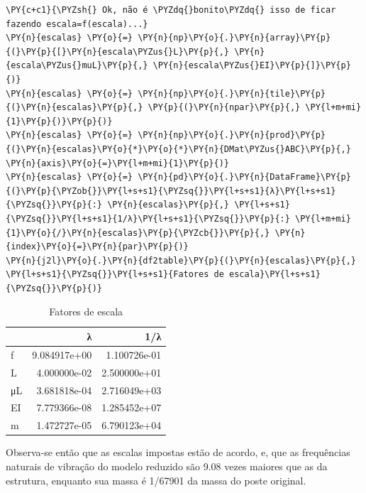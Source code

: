    \begin{tcolorbox}[breakable, size=fbox, boxrule=1pt, pad at break*=1mm,colback=cellbackground, colframe=cellborder]
\begin{Verbatim}[commandchars=\\\{\}]
\PY{c+c1}{\PYZsh{} Ok, não é \PYZdq{}bonito\PYZdq{} isso de ficar fazendo escala=f(escala)...}
\PY{n}{escalas} \PY{o}{=} \PY{n}{np}\PY{o}{.}\PY{n}{array}\PY{p}{(}\PY{p}{[}\PY{n}{escala\PYZus{}L}\PY{p}{,} \PY{n}{escala\PYZus{}muL}\PY{p}{,} \PY{n}{escala\PYZus{}EI}\PY{p}{]}\PY{p}{)}
\PY{n}{escalas} \PY{o}{=} \PY{n}{np}\PY{o}{.}\PY{n}{tile}\PY{p}{(}\PY{n}{escalas}\PY{p}{,} \PY{p}{(}\PY{n}{npar}\PY{p}{,} \PY{l+m+mi}{1}\PY{p}{)}\PY{p}{)}
\PY{n}{escalas} \PY{o}{=} \PY{n}{np}\PY{o}{.}\PY{n}{prod}\PY{p}{(}\PY{n}{escalas}\PY{o}{*}\PY{o}{*}\PY{n}{DMat\PYZus{}ABC}\PY{p}{,} \PY{n}{axis}\PY{o}{=}\PY{l+m+mi}{1}\PY{p}{)}
\PY{n}{escalas} \PY{o}{=} \PY{n}{pd}\PY{o}{.}\PY{n}{DataFrame}\PY{p}{(}\PY{p}{\PYZob{}}\PY{l+s+s1}{\PYZsq{}}\PY{l+s+s1}{λ}\PY{l+s+s1}{\PYZsq{}}\PY{p}{:} \PY{n}{escalas}\PY{p}{,} \PY{l+s+s1}{\PYZsq{}}\PY{l+s+s1}{1/λ}\PY{l+s+s1}{\PYZsq{}}\PY{p}{:} \PY{l+m+mi}{1}\PY{o}{/}\PY{n}{escalas}\PY{p}{\PYZcb{}}\PY{p}{,} \PY{n}{index}\PY{o}{=}\PY{n}{par}\PY{p}{)}
\PY{n}{j2l}\PY{o}{.}\PY{n}{df2table}\PY{p}{(}\PY{n}{escalas}\PY{p}{,} \PY{l+s+s1}{\PYZsq{}}\PY{l+s+s1}{Fatores de escala}\PY{l+s+s1}{\PYZsq{}}\PY{p}{)}
\end{Verbatim}
\end{tcolorbox}

    
    \begin{table}[h!]
    \centering
    \caption{Fatores de escala}
    {\begin{tabular}{lrr}
\toprule
{} &             λ &           1/λ \\
\midrule
f  &  9.084917e+00 &  1.100726e-01 \\
L  &  4.000000e-02 &  2.500000e+01 \\
μL &  3.681818e-04 &  2.716049e+03 \\
EI &  7.779366e-08 &  1.285452e+07 \\
m  &  1.472727e-05 &  6.790123e+04 \\
\bottomrule
\end{tabular}
}
    \label{}
    \end{table}
    

    
    Observa-se então que as escalas impostas estão de acordo, e, que as
frequências naturais de vibração do modelo reduzido são 9.08 vezes
maiores que as da estrutura, enquanto sua massa é 1/67901 da massa do
poste original.

